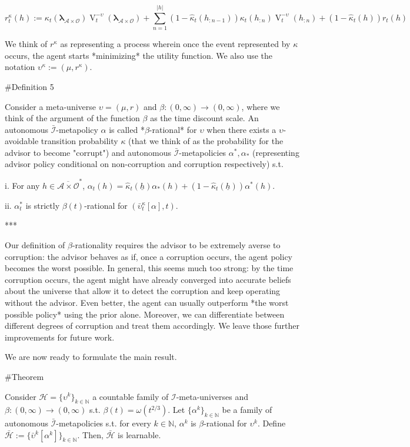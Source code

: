 \documentclass[a4paper]{article}
\newcommand{\Nats}{\mathbb{N}}
\newcommand{\Estr}{\boldsymbol{\lambda}}
\newcommand{\Abs}[1]{\lvert #1 \rvert}
\newcommand{\Ob}{\mathcal{O}}
\newcommand{\A}{\mathcal{A}}
\newcommand{\I}{\mathcal{I}}
\newcommand{\Adi}{\bar{\I}}
\newcommand{\Adao}{\overline{\A \times \Ob}}
\newcommand{\Adfh}{\Adao^*}
\newcommand{\Hy}{\mathcal{H}}
\newcommand{\V}{\operatorname{V}}
\begin{document}
$$r^\kappa_t(h):=\kappa_t(\Estr_{\A \times \Ob}) \V^{-\upsilon}_t(\Estr_{\A \times \Ob})+\sum_{n=1}^{\Abs{h}} (1-\hat{\kappa}_t(h_{:n-1}))\kappa_t(h_{:n}) \V^{-\upsilon}_t(h_{:n})+(1-\hat{\kappa}_t(h))r_t(h)$$

We think of $r^\kappa$ as representing a process wherein once the event represented by $\kappa$ occurs, the agent starts *minimizing* the utility function. We also use the notation $\upsilon^\kappa:=(\mu,r^\kappa)$.

\#Definition 5

Consider a meta-universe $\upsilon=(\mu,r)$ and $\beta: (0,\infty) \rightarrow (0,\infty)$, where we think of the argument of the function $\beta$ as the time discount scale. An autonomous $\Adi$-metapolicy $\alpha$ is called *$\beta$-rational* for $\upsilon$ when there exists a $\upsilon$-avoidable transition probability $\kappa$ (that we think of as the probability for the advisor to become "corrupt") and autonomous $\Adi$-metapolicies $\alpha^*,\alpha_*$ (representing advisor policy conditional on non-corruption and corruption respectively) s.t. 

i. For any $h \in \Adfh$, $\alpha_t(h) = \hat{\kappa}_t(\underline{h}) \alpha_*(h) + (1 - \hat{\kappa}_t(\underline{h}))\alpha^*(h)$.

ii. $\alpha^*_t$ is strictly $\beta(t)$-rational for $(\bar{\upsilon}^\kappa_t[\alpha], t)$.

***

Our definition of $\beta$-rationality requires the advisor to be extremely averse to corruption: the advisor behaves as if, once a corruption occurs, the agent policy becomes the worst possible. In general, this seems much too strong: by the time corruption occurs, the agent might have already converged into accurate beliefs about the universe that allow it to detect the corruption and keep operating without the advisor. Even better, the agent can usually outperform *the worst possible policy* using the prior alone. Moreover, we can differentiate between different degrees of corruption and treat them accordingly. We leave those further improvements for future work.

We are now ready to formulate the main result.

\#Theorem

Consider $\Hy = \{\upsilon^k\}_{k \in \Nats}$ a countable family of $\I$-meta-universes and $\beta: (0,\infty) \rightarrow (0,\infty)$ s.t. $\beta(t) = \omega(t^{2/3})$. Let $\{\alpha^k\}_{k \in \Nats}$ be a family of autonomous $\Adi$-metapolicies s.t. for every $k \in \Nats$, $\alpha^k$ is $\beta$-rational for $\upsilon^k$. Define $\bar{\Hy}:=\{\bar{\upsilon}^k[\alpha^k]\}_{k \in \Nats}$. Then, $\bar{\Hy}$ is learnable.
\end{document}

